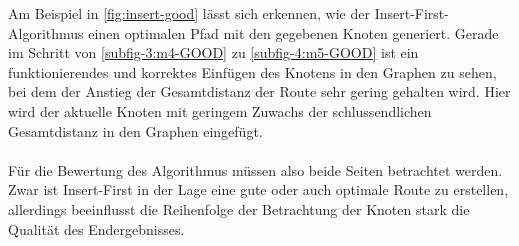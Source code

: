 Am Beispiel in \vref{fig:insert-good} lässt sich erkennen, wie der Insert-First-Algorithmus einen optimalen Pfad mit den gegebenen Knoten generiert. 
Gerade im Schritt von \vref{subfig-3:m4-GOOD} zu \vref{subfig-4:m5-GOOD} ist ein funktionierendes und korrektes Einfügen des Knotens in den Graphen zu sehen, bei dem der Anstieg der Gesamtdistanz der Route sehr gering gehalten wird. 
Hier wird der aktuelle Knoten mit geringem Zuwachs der schlussendlichen Gesamtdistanz in den Graphen eingefügt. \\\\
Für die Bewertung des Algorithmus müssen also beide Seiten betrachtet werden. 
Zwar ist Insert-First in der Lage eine gute oder auch optimale Route zu erstellen, allerdings beeinflusst die Reihenfolge der Betrachtung der Knoten stark die Qualität des Endergebnisses.